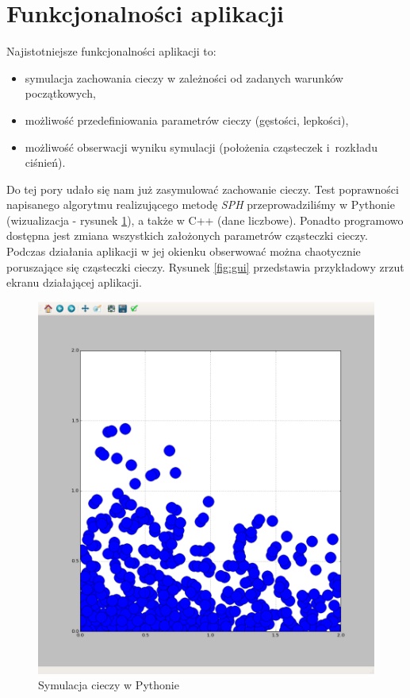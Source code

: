 
\section{Funkcjonalności aplikacji}
Najistotniejsze funkcjonalności aplikacji to:
\begin{itemize}
    \item symulacja zachowania cieczy w zależności od zadanych warunków początkowych,
    \item możliwość przedefiniowania parametrów cieczy (gęstości, lepkości),
    \item możliwość obserwacji wyniku symulacji (położenia cząsteczek i~rozkładu ciśnień).
\end{itemize}

Do tej pory udało się nam już zasymulować zachowanie cieczy. Test poprawności napisanego algorytmu realizującego metodę \textit{SPH} przeprowadziliśmy w \textsf{Pythonie} (wizualizacja - rysunek \ref{fig:python}), a także w \textsf{C++} (dane liczbowe). Ponadto programowo dostępna jest zmiana wszystkich założonych parametrów cząsteczki cieczy. Podczas działania aplikacji w jej okienku obserwować można chaotycznie poruszające się cząsteczki cieczy. Rysunek \ref{fig:gui} przedstawia przykładowy zrzut ekranu działającej aplikacji.

\begin{figure}[H]
 \begin{center}
  \includegraphics[width=\textwidth]{rysunki/pythonViz.png}
 \end{center}
 \caption{Symulacja cieczy w Pythonie}
 \label{fig:python}
\end{figure}
